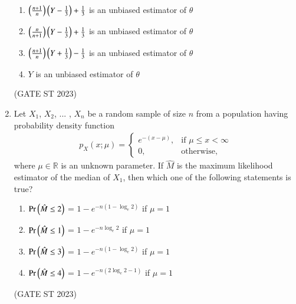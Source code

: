 \begin{enumerate}[label=\thechapter.\arabic*,ref=\thechapter.\theenumi]
\begin{enumerate}
\item $\left(\frac{n+1}{n}\right)\left(Y-\frac{1}{3}\right) + \frac{1}{3}$ is an unbiased estimator of $\theta$
\item $\left(\frac{n}{n+1}\right)\left(Y-\frac{1}{3}\right) + \frac{1}{3}$ is an unbiased estimator of $\theta$
\item $\left(\frac{n+1}{n}\right)\left(Y+\frac{1}{3}\right) - \frac{1}{3}$ is an unbiased estimator of $\theta$
\item $Y$ is an unbiased estimator of $\theta$
\end{enumerate} 
\hfill(GATE ST 2023)\\

\item Let $X_1$, $X_2$, ... , $X_n$ be a random sample of size $n$ from a population having probability density function
\begin{align}
p_X(x; \mu) =
\begin{cases}
e^{-(x-\mu)}, & \text{if } \mu \leq x < \infty \\
0, & \text{otherwise,} 
\end{cases}
\end{align}
where $\mu \in \mathbb{R}$ is an unknown parameter. If $\hat{M}$ is the maximum likelihood estimator of the median of $X_1$, then which one of the following statements is true?
\begin{enumerate}[label=\Alph*)]
  \item $\Pr\left(\hat{M} \leq 2\right)$ = $1 - e^{-n(1-\log_e 2)}$ if $\mu = 1$
  \item $\Pr\left(\hat{M} \leq 1\right)$ = $1 - e^{-n \log_e 2}$ if $\mu = 1$
  \item $\Pr\left(\hat{M} \leq 3\right)$ = $1 - e^{-n(1-\log_e 2)}$ if $\mu = 1$
  \item $\Pr\left(\hat{M} \leq 4\right)$ = $1 - e^{-n(2\log_e 2-1)}$ if $\mu = 1$
\end{enumerate}
\hfill(GATE ST 2023)\\

\end{enumerate}
